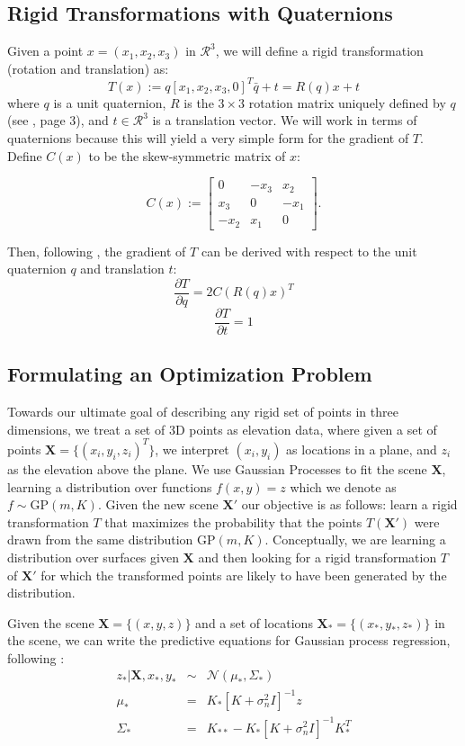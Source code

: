 \documentclass{article} %
\begin{document}
\subsection{Rigid Transformations with Quaternions}
Given a point $x = (x_1,x_2,x_3)$ in $\mathcal{R}^3$, we will define a rigid transformation (rotation and translation) as:
$$T(x) := q [x_1, x_2, x_3, 0]^T \bar q +t = R(q) x + t$$ where $q$ is a unit quaternion, $R$ is the $3 \times 3$ rotation matrix uniquely defined by $q$ (see \cite{wheeler1995}, page 3), and $t \in \mathcal{R}^3$ is a translation vector. We will work in terms of quaternions because this will yield a very simple form for the gradient of $T$. Define $C(x)$ to be the skew-symmetric matrix of $x$:

$$C(x) := \left[ \begin{array}{ccc}
0 & -x_3 & x_2 \\
x_3 & 0 & -x_1 \\
-x_2 & x_1 & 0 \end{array} \right].$$

Then, following \cite{wheeler1995}, the gradient of $T$ can be derived with respect to the unit quaternion $q$ and translation $t$:
$$\frac{\partial T}{\partial q}= 2C(R(q)x)^T$$
$$\frac{\partial T}{\partial t}= 1$$

\subsection{Formulating an Optimization Problem}
Towards our ultimate goal of describing any rigid set of points in three dimensions, we treat a set of 3D points as elevation data, where given a set of points $\mathbf{X} = \{(x_i,y_i,z_i)^{T}\}$, we interpret $(x_i,y_i)$ as locations in a plane, and $z_i$ as the elevation above the plane. We use Gaussian Processes to fit the scene $\mathbf{X}$, learning a distribution over functions $f(x,y) = z$ which we denote as $f \sim \mbox{GP}(m,K)$. Given the new scene $\mathbf{X'}$ our objective is as follows: learn a rigid transformation $T$ that maximizes the probability that the points $T(\mathbf{X'})$ were drawn from the same distribution $\mbox{GP}(m,K)$. Conceptually, we are learning a distribution over surfaces given $\mathbf{X}$ and then looking for a rigid transformation $T$ of $\mathbf{X'}$ for which the transformed points are likely to have been generated by the distribution.

Given the scene $\mathbf{X} = \{(x,y,z)\}$ and a set of locations $\mathbf{X}_{*} = \{(x_*,y_*,z_*)\}$ in the scene, we can write the predictive equations for Gaussian process regression, following \cite{rasmussen2006gaussian}:
\begin{eqnarray}
z_{*} | \mathbf{X}, x_*,y_* &\sim& \mathcal{N}(\mu_*, \Sigma_*) \\
\mu_* &=& K_*[K + \sigma_n^2 I]^{-1} z \\
\Sigma_* &=& K_{**} - K_*[K + \sigma_n^2 I]^{-1} K_*^T
\end{eqnarray}
\end{document}
